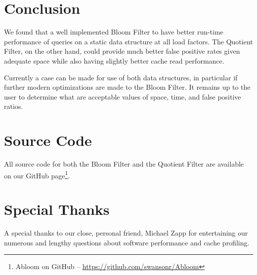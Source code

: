 \documentclass[twoside]{article}
\begin{document}
\section{Conclusion}

We found that a well implemented Bloom Filter to have better run-time performance of queries on a static data structure at all load factors. The Quotient Filter, on the other hand, could provide much better false positive rates given adequate space while also having slightly better cache read performance.

Currently a case can be made for use of both data structures, in particular if further modern optimizations are made to the Bloom Filter. It remains up to the user to determine what are acceptable values of space, time, and false positive ratios.

\newpage
\appendix
\section{Source Code}
All source code for both the Bloom Filter and the Quotient Filter are available on our GitHub page\footnote{Abloom on GitHub -- \url{https://github.com/swansonr/Abloom}}.

\section{Special Thanks}
A special thanks to our close, personal friend, Michael Zapp for entertaining our numerous and lengthy questions about software performance and cache profiling.
\end{document}
